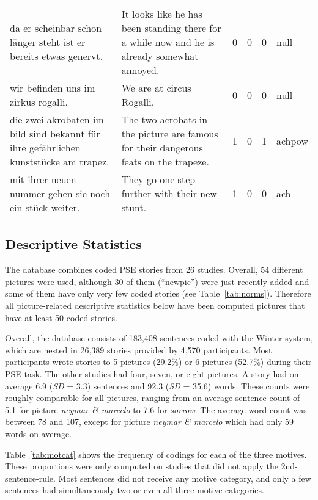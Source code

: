\documentclass[man,a4paper,mask]{apa6}
\begin{document}
{\begin{table*}
\begin{tabularx}{\textwidth}{XXrrrl}
  da er scheinbar schon länger steht ist er bereits etwas genervt. & It looks like he has been standing there for a while now and he is already somewhat annoyed. &   0 &   0 &   0 & null \\ 
  wir befinden uns im zirkus rogalli. & We are at circus Rogalli. &   0 &   0 &   0 & null \\ 
  die zwei akrobaten im bild sind bekannt für ihre gefährlichen kunststücke am trapez. & The two acrobats in the picture are famous for their dangerous feats on the trapeze. &   1 &   0 &   1 & achpow \\ 
  mit ihrer neuen nummer gehen sie noch ein stück weiter. & They go one step further with their new stunt. &   1 &   0 &   0 & ach \\ 
   \hline

		\bottomrule
		\end{tabularx}
\end{table*}

\subsection{Descriptive Statistics}

The database combines coded PSE stories from 26 studies. Overall, 54 different pictures were used, although 30 of them (``newpic'') were just recently added and some of them have only very few coded stories (see Table~\ref{tab:norms}). Therefore all picture-related descriptive statistics below have been computed pictures that have at least 50 coded stories.

Overall, the database consists of 183,408 sentences coded with the Winter system, which are nested in 26,389 stories provided by 4,570 participants. Most participants wrote stories to 5 pictures (29.2\%) or 6 pictures (52.7\%) during their PSE task. The other studies had four, seven, or eight pictures. A story had on average 6.9 (\emph{SD} = 3.3) sentences and 92.3 (\emph{SD} = 35.6) words. These counts were roughly comparable for all pictures, ranging from an average sentence count of 5.1 for picture \emph{neymar \& marcelo} to 7.6 for \emph{sorrow}. The average word count was between 78 and 107, except for picture \emph{neymar \& marcelo} which had only 59 words on average.


Table~\ref{tab:motcat} shows the frequency of codings for each of the three motives. These proportions were only computed on studies that did not apply the 2nd-sentence-rule. Most sentences did not receive any motive category, and only a few sentences had simultaneously two or even all three motive categories.

}
\end{document}
